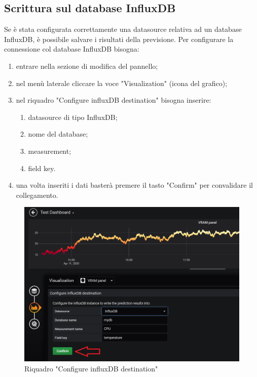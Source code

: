     \subsection{Scrittura sul database InfluxDB}
        Se è stata configurata correttamente una datasource relativa ad un database InfluxDB, è possibile salvare i risultati della previsione. Per configurare la connessione col database InfluxDB bisogna:
        \begin{enumerate}
            \item entrare nella sezione di modifica del pannello;
            \item nel menù laterale cliccare la voce "Visualization" (icona del grafico);
            \item nel riquadro "Configure influxDB destination" bisogna inserire:
            \begin{enumerate}
                \item datasource di tipo InfluxDB;
                \item nome del database;
                \item measurement;
                \item field key.
            \end{enumerate}
            \item una volta inseriti i dati basterà premere il tasto "Confirm" per convalidare il collegamento.
        \end{enumerate}
        \begin{figure}[H]
            \includegraphics[width=\textwidth,height=\textheight,keepaspectratio]{img/scrittura_InfluxDB.png}
            \caption{Riquadro "Configure influxDB destination"}
        \end{figure}
